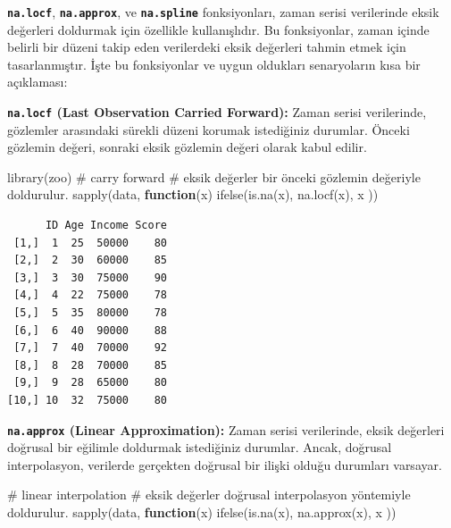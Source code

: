\documentclass[
  letterpaper,
  DIV=11,
  numbers=noendperiod]{scrreprt}
\newenvironment{Shaded}{\begin{snugshade}}{\end{snugshade}}
\newcommand{\CommentTok}[1]{\textcolor[rgb]{0.37,0.37,0.37}{#1}}
\newcommand{\ControlFlowTok}[1]{\textcolor[rgb]{0.00,0.23,0.31}{\textbf{#1}}}
\newcommand{\FunctionTok}[1]{\textcolor[rgb]{0.28,0.35,0.67}{#1}}
\newcommand{\NormalTok}[1]{\textcolor[rgb]{0.00,0.23,0.31}{#1}}
\begin{document}
\textbf{\texttt{na.locf}}, \textbf{\texttt{na.approx}}, ve
\textbf{\texttt{na.spline}} fonksiyonları, zaman serisi verilerinde
eksik değerleri doldurmak için özellikle kullanışlıdır. Bu fonksiyonlar,
zaman içinde belirli bir düzeni takip eden verilerdeki eksik değerleri
tahmin etmek için tasarlanmıştır. İşte bu fonksiyonlar ve uygun
oldukları senaryoların kısa bir açıklaması:

\textbf{\texttt{na.locf} (Last Observation Carried Forward):} Zaman
serisi verilerinde, gözlemler arasındaki sürekli düzeni korumak
istediğiniz durumlar. Önceki gözlemin değeri, sonraki eksik gözlemin
değeri olarak kabul edilir.

\begin{Shaded}
\begin{Highlighting}[]
\FunctionTok{library}\NormalTok{(zoo)}
\CommentTok{\# carry forward}
\CommentTok{\# eksik değerler bir önceki gözlemin değeriyle doldurulur.}
\FunctionTok{sapply}\NormalTok{(data, }\ControlFlowTok{function}\NormalTok{(x) }\FunctionTok{ifelse}\NormalTok{(}\FunctionTok{is.na}\NormalTok{(x), }\FunctionTok{na.locf}\NormalTok{(x), x ))}
\end{Highlighting}
\end{Shaded}

\begin{verbatim}
      ID Age Income Score
 [1,]  1  25  50000    80
 [2,]  2  30  60000    85
 [3,]  3  30  75000    90
 [4,]  4  22  75000    78
 [5,]  5  35  80000    78
 [6,]  6  40  90000    88
 [7,]  7  40  70000    92
 [8,]  8  28  70000    85
 [9,]  9  28  65000    80
[10,] 10  32  75000    80
\end{verbatim}

\textbf{\texttt{na.approx} (Linear Approximation):} Zaman serisi
verilerinde, eksik değerleri doğrusal bir eğilimle doldurmak istediğiniz
durumlar. Ancak, doğrusal interpolasyon, verilerde gerçekten doğrusal
bir ilişki olduğu durumları varsayar.

\begin{Shaded}
\begin{Highlighting}[]
\CommentTok{\# linear interpolation}
\CommentTok{\# eksik değerler doğrusal interpolasyon yöntemiyle doldurulur.}
\FunctionTok{sapply}\NormalTok{(data, }\ControlFlowTok{function}\NormalTok{(x) }\FunctionTok{ifelse}\NormalTok{(}\FunctionTok{is.na}\NormalTok{(x), }\FunctionTok{na.approx}\NormalTok{(x), x ))}
\end{Highlighting}
\end{Shaded}
\end{document}
